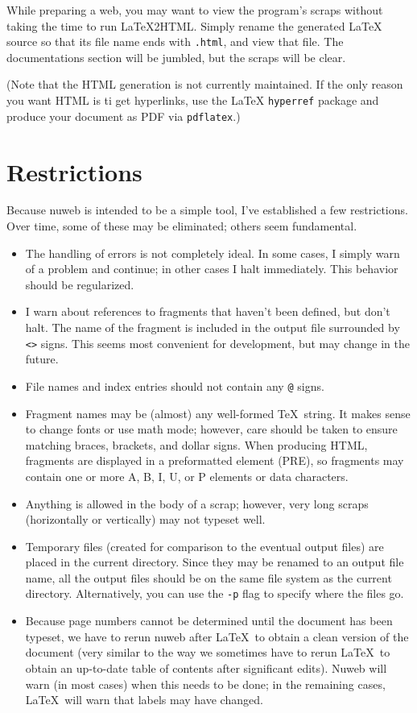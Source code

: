 \documentclass[a4paper]{report}
\begin{document}
While preparing a web, you may want to view the program's scraps without
taking the time to run {\LaTeX}2HTML\@.  Simply rename the generated
{\LaTeX} source so that its file name ends with \verb|.html|, and view
that file.  The documentations section will be jumbled, but the
scraps will be clear.

(Note that the HTML generation is not currently maintained. If the
only reason you want HTML is ti get hyperlinks, use the {\LaTeX}
\verb|hyperref| package and produce your document as PDF via
\verb|pdflatex|.)

\section{Restrictions}

Because nuweb is intended to be a simple tool, I've established a few
restrictions. Over time, some of these may be eliminated; others seem
fundamental.
\begin{itemize}
\item The handling of errors is not completely ideal. In some cases, I
  simply warn of a problem and continue; in other cases I halt
  immediately. This behavior should be regularized.
\item I warn about references to fragments that haven't been defined, but
  don't halt. The name of the fragment is included in the output file
  surrounded by \verb|<>| signs.
  This seems most convenient for development, but may change
  in the future.
\item File names and index entries should not contain any \verb|@|
  signs.
\item Fragment names may be (almost) any well-formed \TeX\ string.
  It makes sense to change fonts or use math mode; however, care should
  be taken to ensure matching braces, brackets, and dollar signs.
  When producing HTML, fragments are displayed in a preformatted element
  (PRE), so fragments may contain one or more A, B, I, U, or P elements
  or data characters.
\item Anything is allowed in the body of a scrap; however, very
  long scraps (horizontally or vertically) may not typeset well.
\item Temporary files (created for comparison to the eventual
  output files) are placed in the current directory. Since they may be
  renamed to an output file name, all the output files should be on the
  same file system as the current directory. Alternatively, you can
  use the \verb|-p| flag to specify where the files go.
\item Because page numbers cannot be determined until the document has
  been typeset, we have to rerun nuweb after \LaTeX\ to obtain a clean
  version of the document (very similar to the way we sometimes have
  to rerun \LaTeX\ to obtain an up-to-date table of contents after
  significant edits).  Nuweb will warn (in most cases) when this needs
  to be done; in the remaining cases, \LaTeX\ will warn that labels
  may have changed.
\end{itemize}
\end{document}
